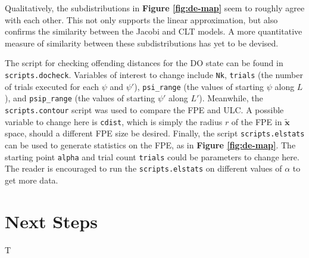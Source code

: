 \documentclass[letterpaper,12pt]{article}
\numberwithin{table}{section}
\numberwithin{figure}{section}
\numberwithin{equation}{section}
\newcommand{\reffig}[1]{\textbf{Figure \ref{#1}}}
\begin{document}
\begin{flushleft}
\begin{figure}[!h]
    \end{figure}

    Qualitatively, the subdistributions in \reffig{fig:de-map} seem to roughly agree with each other. This not only supports the linear approximation, but also confirms the similarity between the Jacobi and CLT models. A more quantitative measure of similarity between these subdistributions has yet to be devised.

    The script for checking offending distances for the DO state can be found in \texttt{scripts.docheck}. Variables of interest to change include \texttt{Nk}, \texttt{trials} (the number of trials executed for each $\psi$ and $\psi'$), \texttt{psi\_range} (the values of starting $\psi$ along $L$), and \texttt{psip\_range} (the values of starting $\psi'$ along $L'$). Meanwhile, the \texttt{scripts.contour} script was used to compare the FPE and ULC. A possible variable to change here is \texttt{cdist}, which is simply the radius $r$ of the FPE in $\tilde{\mathbf{x}}$ space, should a different FPE size be desired. Finally, the script \texttt{scripts.elstats} can be used to generate statistics on the FPE, as in \reffig{fig:de-map}. The starting point \texttt{alpha} and trial count \texttt{trials} could be parameters to change here. The reader is encouraged to run the \texttt{scripts.elstats} on different values of $\alpha$ to get more data.

    \pagebreak

    \section{Next Steps}
    T

    \pagebreak

    
    

\end{flushleft}
\end{document}
